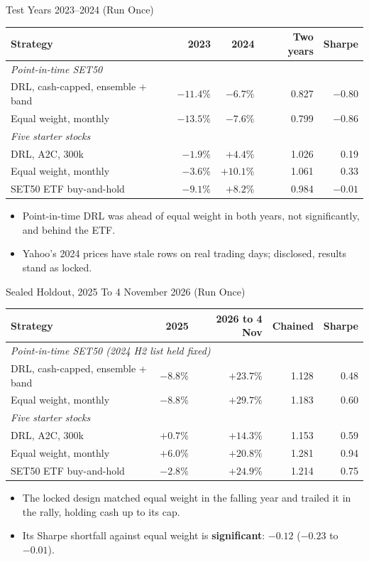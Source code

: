 \begin{frame}{Test Years 2023--2024 (Run Once)}
\begin{center}
\scriptsize
\begin{tabular}{lrrrr}
\toprule
Strategy & 2023 & 2024 & Two years & Sharpe \\
\midrule
\multicolumn{5}{l}{\emph{Point-in-time SET50}} \\
DRL, cash-capped, ensemble + band & $-11.4\%$ & $-6.7\%$ & 0.827 & $-0.80$ \\
Equal weight, monthly & $-13.5\%$ & $-7.6\%$ & 0.799 & $-0.86$ \\
\multicolumn{5}{l}{\emph{Five starter stocks}} \\
DRL, A2C, 300k & $-1.9\%$ & $+4.4\%$ & 1.026 & 0.19 \\
Equal weight, monthly & $-3.6\%$ & $+10.1\%$ & 1.061 & 0.33 \\
\midrule
SET50 ETF buy-and-hold & $-9.1\%$ & $+8.2\%$ & 0.984 & $-0.01$ \\
\bottomrule
\end{tabular}
\end{center}
\begin{itemize}
  \item Point-in-time DRL was ahead of equal weight in both years, not significantly, and behind the ETF.
  \item Yahoo's 2024 prices have stale rows on real trading days; disclosed, results stand as locked.
\end{itemize}
\end{frame}

\begin{frame}{Sealed Holdout, 2025 To 4 November 2026 (Run Once)}
\begin{center}
\scriptsize
\begin{tabular}{lrrrr}
\toprule
Strategy & 2025 & 2026 to 4 Nov & Chained & Sharpe \\
\midrule
\multicolumn{5}{l}{\emph{Point-in-time SET50 (2024 H2 list held fixed)}} \\
DRL, cash-capped, ensemble + band & $-8.8\%$ & $+23.7\%$ & 1.128 & 0.48 \\
Equal weight, monthly & $-8.8\%$ & $+29.7\%$ & 1.183 & 0.60 \\
\multicolumn{5}{l}{\emph{Five starter stocks}} \\
DRL, A2C, 300k & $+0.7\%$ & $+14.3\%$ & 1.153 & 0.59 \\
Equal weight, monthly & $+6.0\%$ & $+20.8\%$ & 1.281 & 0.94 \\
\midrule
SET50 ETF buy-and-hold & $-2.8\%$ & $+24.9\%$ & 1.214 & 0.75 \\
\bottomrule
\end{tabular}
\end{center}
\begin{itemize}
  \item The locked design matched equal weight in the falling year and trailed it in the rally, holding cash up to its cap.
  \item Its Sharpe shortfall against equal weight is \textbf{significant}: $-0.12$ ($-0.23$ to $-0.01$).
\end{itemize}
\end{frame}

